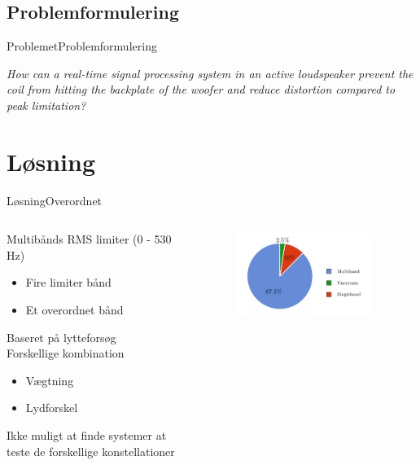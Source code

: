 \subsection{Problemformulering}
\begin{frame}{Problemet}{Problemformulering}
\begin{center}
\textit{How can a real-time signal processing system in an active loudspeaker prevent the coil from hitting the backplate of the woofer and reduce distortion compared to peak limitation?}
\end{center}

\end{frame}

\section{Løsning}
\begin{frame}{Løsning}{Overordnet}
\begin{columns}
\begin{column}{0.45\textwidth}
Multibånds RMS limiter (0 - 530 Hz)
\begin{itemize}
\item Fire limiter bånd
\item Et overordnet bånd
\end{itemize}
\vspace{5mm}
Baseret på lytteforsøg\\
\vspace{5mm}
Forskellige kombination
\begin{itemize}
\item Vægtning
\item Lydforskel
\end{itemize}
\vspace{5mm}
Ikke muligt at finde systemer at teste de forskellige konstellationer
\end{column}
\begin{column}{0.5\textwidth}
\begin{figure}[H]
\centering
\includegraphics[width=0.9\textwidth]{roundChart}
\end{figure}
\end{column}
\end{columns}

\end{frame}

